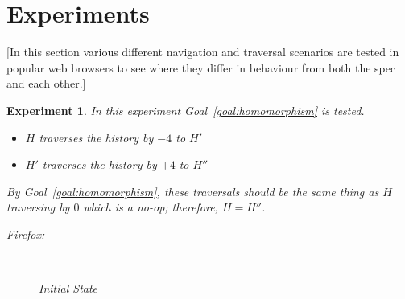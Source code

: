\documentclass{notes}
\newcommand{\aNH}{H}
\newtheorem{experiment}{Experiment}
\begin{document}
\section{Experiments}
\label{sec:experiments}

[In this section various different navigation and traversal scenarios are tested in popular web browsers to see where they differ in behaviour from both the spec and each other.]

\begin{experiment}
  In this experiment Goal~\ref{goal:homomorphism} is tested.
  \begin{itemize}
    \item \emph{$\aNH$ traverses the history by $-4$ to $\aNH'$}
    \item \emph{$\aNH'$ traverses the history by $+4$ to $\aNH''$}
  \end{itemize}
  By Goal~\ref{goal:homomorphism}, these traversals should be the same thing as \emph{$\aNH$ traversing by $0$} which is a no-op; therefore, $\aNH = \aNH''$.

  Firefox:
  \begin{figure}[H]
    ~
    \caption{Initial State}
  \end{figure}


\end{experiment}
\end{document}
